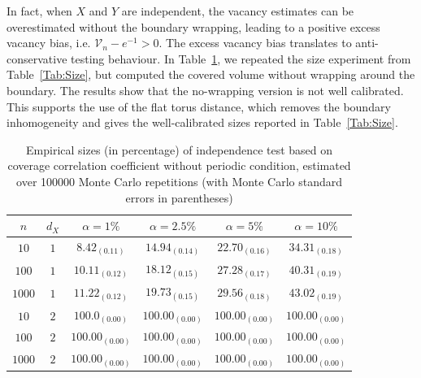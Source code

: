 \documentclass[11pt]{article}
\begin{document}
In fact, when $X$ and $Y$ are independent, the vacancy estimates can be overestimated without the boundary wrapping, leading to a positive excess vacancy bias, i.e. $\mathcal{V}_n - e^{-1}>0$. The excess vacancy bias translates to anti-conservative testing behaviour. In Table~\ref{Tab:no-wrapping}, we repeated the size experiment from Table~\ref{Tab:Size}, but computed the covered volume without wrapping around the boundary. The results show that the no-wrapping version is not well calibrated. This supports the use of the flat torus distance, which removes the boundary inhomogeneity and gives the well-calibrated sizes reported in Table~\ref{Tab:Size}.

\begin{table}
\centering
\begin{tabular}{cccccc}
$n$ & $d_X$ &  $\alpha = 1\%$ & $\alpha = 2.5\%$ &  $\alpha = 5\%$ &  $\alpha = 10\%$\\
\hline
$10$ & $1$ & $8.42_{(0.11)}$ & $14.94_{(0.14)}$ & $22.70_{(0.16)}$ & $34.31_{(0.18)}$\\
$100$ & $1$ & $10.11_{(0.12)}$ & $18.12_{(0.15)}$ & $27.28_{(0.17)}$ & $40.31_{(0.19)}$\\
$1000$ & $1$ & $11.22_{(0.12)}$ & $19.73_{(0.15)}$ & $29.56_{(0.18)}$ & $43.02_{(0.19)}$\\
$10$ & $2$ & $100.0_{(0.00)}$ & $100.00_{(0.00)}$ & $100.00_{(0.00)}$ & $100.00_{(0.00)}$\\
$100$ & $2$ & $100.00_{(0.00)}$ & $100.00_{(0.00)}$ & $100.00_{(0.00)}$ & $100.00_{(0.00)}$\\
$1000$ & $2$ & $100.00_{(0.00)}$ & $100.00_{(0.00)}$ & $100.00_{(0.00)}$ & $100.00_{(0.00)}$\\
\end{tabular}

\caption{\label{Tab:no-wrapping}Empirical sizes (in percentage) of independence test based on coverage correlation coefficient without periodic condition, estimated over 100000 Monte Carlo repetitions (with Monte Carlo standard errors in parentheses)}
\end{table}



\end{document}
